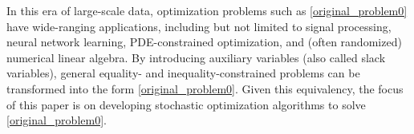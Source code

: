 \documentclass[aos]{imsart}
\numberwithin{equation}{section}
\theoremstyle{plain}
\begin{document}
In this era of large-scale data, optimization problems such as \eqref{original_problem0} have wide-ranging applications, including but not limited to signal processing, neural network learning, PDE-constrained optimization, and (often randomized) numerical linear algebra.
By introducing auxiliary variables (also called slack variables), general equality- and inequality-constrained problems can be transformed into the form \eqref{original_problem0}.
Given this equivalency, the focus of this paper is on developing stochastic optimization algorithms to solve \eqref{original_problem0}.
\end{document}
